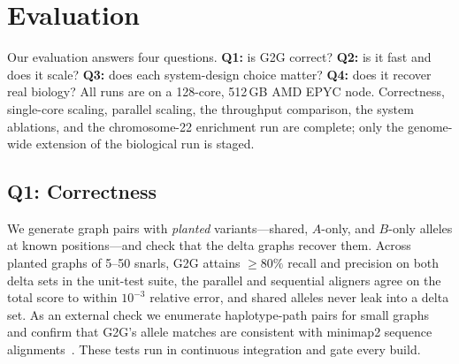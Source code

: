 \documentclass[conference]{IEEEtran}
\theoremstyle{plain}
\theoremstyle{definition}
\begin{document}
\section{Evaluation}
\label{sec:eval}
Our evaluation answers four questions. \textbf{Q1:} is \textsc{G2G} correct?
\textbf{Q2:} is it fast and does it scale? \textbf{Q3:} does each system-design
choice matter? \textbf{Q4:} does it recover real biology? All runs are on a 128-core,
512\,GB AMD EPYC node. Correctness, single-core scaling, parallel scaling, the
throughput comparison, the system ablations, and the chromosome-22 enrichment run
are complete; only the genome-wide extension of the biological run is staged.

\subsection{Q1: Correctness}
We generate graph pairs with \emph{planted} variants---shared, $A$-only, and
$B$-only alleles at known positions---and check that the delta graphs recover
them. Across planted graphs of 5--50 snarls, \textsc{G2G} attains $\ge 80\%$
recall and precision on both delta sets in the unit-test suite, the parallel and
sequential aligners agree on the total score to within $10^{-3}$ relative error,
and shared alleles never leak into a delta set. As an external check we
enumerate haplotype-path pairs for small graphs and confirm that \textsc{G2G}'s
allele matches are consistent with minimap2 sequence
alignments~\cite{li2018minimap2}. These tests run in continuous integration and
gate every build.
\end{document}
